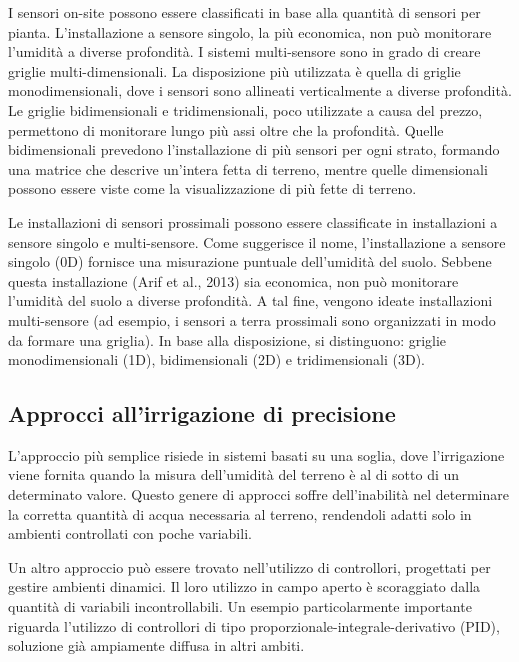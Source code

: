 \documentclass[12pt,a4paper,openright,twoside]{book}
\begin{document}
I sensori on-site possono essere classificati in base alla quantità di sensori per pianta. L'installazione a sensore singolo, la più economica, non può monitorare l'umidità a diverse profondità.
I sistemi multi-sensore sono in grado di creare griglie multi-dimensionali.
La disposizione più utilizzata è quella di griglie monodimensionali, dove i sensori sono allineati verticalmente a diverse profondità.
Le griglie bidimensionali e tridimensionali, poco utilizzate a causa del prezzo, permettono di monitorare lungo più assi oltre che la profondità. Quelle bidimensionali prevedono l'installazione di più sensori per ogni strato, formando una matrice che descrive un'intera fetta di terreno, mentre quelle dimensionali possono essere viste come la visualizzazione di più fette di terreno.

Le installazioni di sensori prossimali possono essere classificate in installazioni a sensore singolo e multi-sensore. Come suggerisce il nome, l'installazione a sensore singolo (0D) fornisce una misurazione puntuale dell'umidità del suolo.
Sebbene questa installazione (Arif et al., 2013) sia economica, non può monitorare l'umidità del suolo a diverse profondità. A tal fine, vengono ideate installazioni multi-sensore (ad esempio, i sensori a terra prossimali sono organizzati in modo da formare una griglia). In base alla disposizione, si distinguono: griglie monodimensionali (1D), bidimensionali (2D) e tridimensionali (3D).

\subsection{Approcci all'irrigazione di precisione}

L'approccio più semplice risiede in sistemi basati su una soglia, dove l'irrigazione viene fornita quando la misura dell'umidità del terreno è al di sotto di un determinato valore.
Questo genere di approcci soffre dell'inabilità nel determinare la corretta quantità di acqua necessaria al terreno, rendendoli adatti solo in ambienti controllati con poche variabili.

Un altro approccio può essere trovato nell'utilizzo di controllori, progettati per gestire ambienti dinamici. Il loro utilizzo in campo aperto è scoraggiato dalla quantità di variabili incontrollabili.
Un esempio particolarmente importante riguarda l'utilizzo di controllori di tipo proporzionale-integrale-derivativo (PID), soluzione già ampiamente diffusa in altri ambiti.
\end{document}
